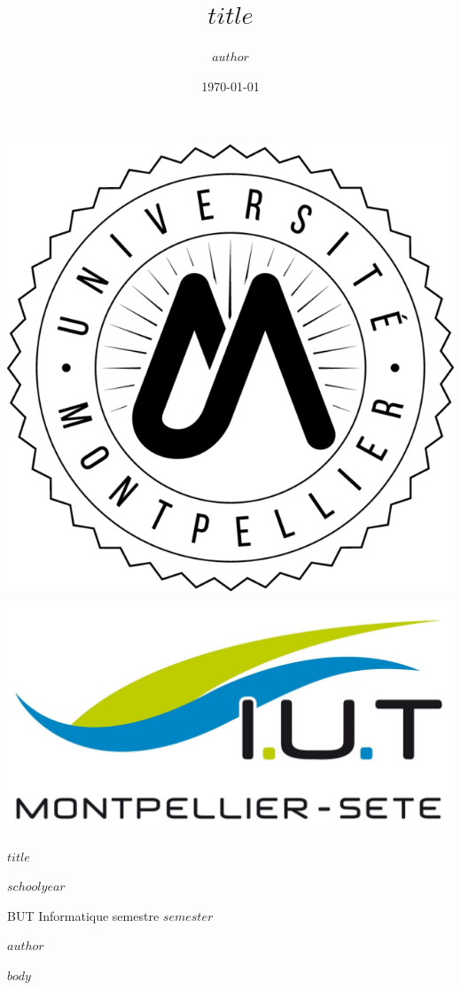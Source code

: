 \documentclass[11pt]{article}
\title{$title$}
\author{$author$}
\date{\today}
\let\oldincludegraphics\includegraphics
\renewcommand{\includegraphics}[2][]{\oldincludegraphics[width=15cm, #1]{#2}}
\begin{document}
\begin{titlepage}
    \centering
    \vspace*{2cm}

    \begin{minipage}{0.5\textwidth}
        \centering
        \includegraphics[width=0.6\textwidth]{ressources/logoUM.png} %
    \end{minipage}%
    \begin{minipage}{0.5\textwidth}
        \centering
        \includegraphics[width=0.8\textwidth]{ressources/logoIUT.png} %
    \end{minipage}

    \vspace*{4cm}
    \Huge\oswald\fontsize{26}{24}\color{titleColor}\bfseries $title$\par
    \vspace{2cm}
    \vfill
    \raggedleft
    {\Large\sans\bfseries\linespread{1.2}\fontsize{11}{24}\color{black}\selectfont $schoolyear$\par
    BUT Informatique semestre $semester$\par
    $author$\par}
\end{titlepage}

$body$
\end{document}
